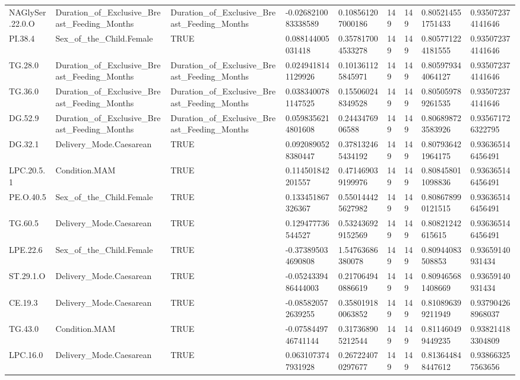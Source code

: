\begin{longtable}{lllllllll}
NAGlySer.22.0.O & Duration\_of\_Exclusive\_Breast\_Feeding\_Months & Duration\_of\_Exclusive\_Breast\_Feeding\_Months & -0.0268210083338589 & 0.108561207000186 & 149 & 149 & 0.805214551751433 & 0.935072374141646 \\
PI.38.4 & Sex\_of\_the\_Child.Female & TRUE & 0.088144005031418 & 0.357817004533278 & 149 & 149 & 0.805771224181555 & 0.935072374141646 \\
TG.28.0 & Duration\_of\_Exclusive\_Breast\_Feeding\_Months & Duration\_of\_Exclusive\_Breast\_Feeding\_Months & 0.0249418141129926 & 0.101361125845971 & 149 & 149 & 0.805979344064127 & 0.935072374141646 \\
TG.36.0 & Duration\_of\_Exclusive\_Breast\_Feeding\_Months & Duration\_of\_Exclusive\_Breast\_Feeding\_Months & 0.0383400781147525 & 0.155060248349528 & 149 & 149 & 0.805059789261535 & 0.935072374141646 \\
DG.52.9 & Duration\_of\_Exclusive\_Breast\_Feeding\_Months & Duration\_of\_Exclusive\_Breast\_Feeding\_Months & 0.0598356214801608 & 0.2443476906588 & 149 & 149 & 0.806898723583926 & 0.935671726322795 \\
DG.32.1 & Delivery\_Mode.Caesarean & TRUE & 0.0920890528380447 & 0.378132465434192 & 149 & 149 & 0.807936421964175 & 0.936365146456491 \\
LPC.20.5.1 & Condition.MAM & TRUE & 0.114501842201557 & 0.471469039199976 & 149 & 149 & 0.808458011098836 & 0.936365146456491 \\
PE.O.40.5 & Sex\_of\_the\_Child.Female & TRUE & 0.133451867326367 & 0.550144425627982 & 149 & 149 & 0.808678990121515 & 0.936365146456491 \\
TG.60.5 & Delivery\_Mode.Caesarean & TRUE & 0.129477736544527 & 0.532436929152569 & 149 & 149 & 0.80821242615615 & 0.936365146456491 \\
LPE.22.6 & Sex\_of\_the\_Child.Female & TRUE & -0.373895034690808 & 1.54763686380078 & 149 & 149 & 0.80944083508853 & 0.93659140931434 \\
ST.29.1.O & Delivery\_Mode.Caesarean & TRUE & -0.0524339486444003 & 0.217064940886619 & 149 & 149 & 0.809465681408669 & 0.93659140931434 \\
CE.19.3 & Delivery\_Mode.Caesarean & TRUE & -0.085820572639255 & 0.358019180063852 & 149 & 149 & 0.810896399211949 & 0.937904268968037 \\
TG.43.0 & Condition.MAM & TRUE & -0.0758449746741144 & 0.317368905212544 & 149 & 149 & 0.811460499449235 & 0.938214183304809 \\
LPC.16.0 & Delivery\_Mode.Caesarean & TRUE & 0.0631073747931928 & 0.267224070297677 & 149 & 149 & 0.813644848447612 & 0.938663257563656 \\

\end{longtable}
